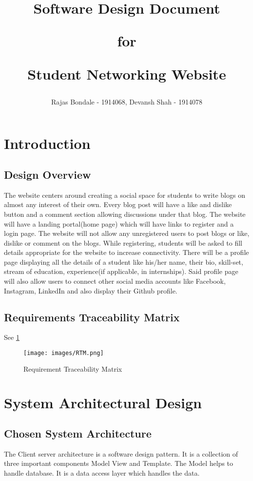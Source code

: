\documentclass[12pt]{article}
\title{Software Design Document

for

Student Networking Website}
\author{Rajas Bondale - 1914068, Devansh Shah - 1914078}
\begin{document}
\maketitle
\pagebreak
\tableofcontents
\pagebreak
\section{Introduction}
\subsection{Design Overview}
The website centers around creating a social space for students to write blogs on almost any interest of their own. Every blog post will have a like and dislike button and a comment section allowing discussions under that blog.
The website will have a landing portal(home page) which will have links to register and a login page. The website will not allow any unregistered users to post blogs or like, dislike or comment on the blogs. While registering, students will be asked to fill details appropriate for the website to increase connectivity.
There will be a profile page displaying all the details of a student like his/her name, their bio, skill-set, stream of education, experience(if applicable, in internships). Said profile page will also allow users to connect other social media accounts like Facebook, Instagram, LinkedIn and also display their Github profile.
    
\subsection{Requirements Traceability Matrix}
See \ref{fig:Requirement Traceability Matrix}
\begin{figure}[H]
    \centering
    \texttt{[image: images/RTM.png]}
    \caption{Requirement Traceability Matrix}
    \label{fig:Requirement Traceability Matrix}
\end{figure}


\section{System Architectural Design}
\subsection{Chosen System Architecture}
The Client server architecture is a software design pattern. It is a collection of three important components Model View and Template. 
The Model helps to handle database. It is a data access layer which handles the data.
\end{document}
